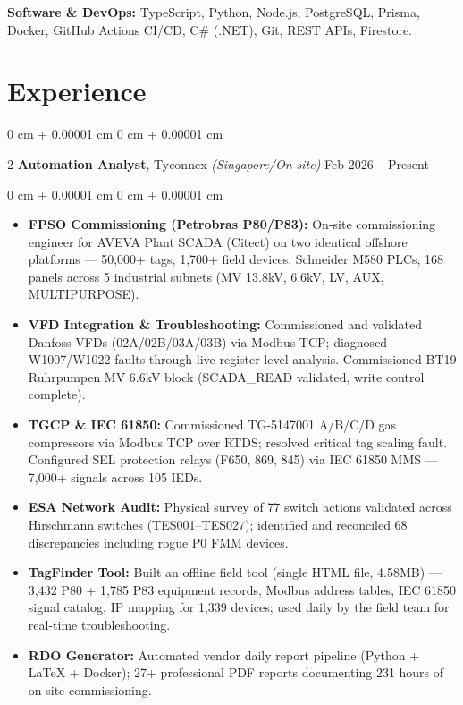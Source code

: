 \documentclass[10pt, letterpaper]{article}
\newenvironment{highlights}{ \begin{itemize}[ topsep=0.10 cm, parsep=0.10 cm, partopsep=0pt,
itemsep=0pt, leftmargin=0 cm + 10pt ] }{ \end{itemize} }
\newenvironment{onecolentry}{ \begin{adjustwidth}{ 0 cm + 0.00001 cm }{ 0 cm + 0.00001 cm }
}{ \end{adjustwidth} }
\newenvironment{twocolentry}[2][]{ \onecolentry \def\secondColumn{#2} \setcolumnwidth{\fill, 4.5 cm}
\begin{paracol}{2} }{ \switchcolumn \raggedleft \secondColumn \end{paracol}
\endonecolentry }
\begin{document}
    \textbf{Software \& DevOps:} TypeScript, Python, Node.js, PostgreSQL, Prisma, Docker, GitHub Actions CI/CD, C\# (.NET), Git, REST APIs, Firestore.

	\section{Experience}

	\begin{twocolentry}
		{ Feb 2026 -- Present } \textbf{Automation Analyst}, Tyconnex \textit{(Singapore/On-site)}
	\end{twocolentry}

	\vspace{0.10 cm}
	\begin{onecolentry}
		\begin{highlights}
			\item \textbf{FPSO Commissioning (Petrobras P80/P83):} On-site commissioning engineer for AVEVA Plant SCADA (Citect) on two identical offshore platforms --- 50,000+ tags, 1,700+ field devices, Schneider M580 PLCs, 168 panels across 5 industrial subnets (MV 13.8kV, 6.6kV, LV, AUX, MULTIPURPOSE).
            \item \textbf{VFD Integration \& Troubleshooting:} Commissioned and validated Danfoss VFDs (02A/02B/03A/03B) via Modbus TCP; diagnosed W1007/W1022 faults through live register-level analysis. Commissioned BT19 Ruhrpumpen MV 6.6kV block (SCADA\_READ validated, write control complete).
            \item \textbf{TGCP \& IEC 61850:} Commissioned TG-5147001 A/B/C/D gas compressors via Modbus TCP over RTDS; resolved critical tag scaling fault. Configured SEL protection relays (F650, 869, 845) via IEC 61850 MMS --- 7,000+ signals across 105 IEDs.
			\item \textbf{ESA Network Audit:} Physical survey of 77 switch actions validated across Hirschmann switches (TES001--TES027); identified and reconciled 68 discrepancies including rogue P0 FMM devices.
            \item \textbf{TagFinder Tool:} Built an offline field tool (single HTML file, 4.58MB) --- 3,432 P80 + 1,785 P83 equipment records, Modbus address tables, IEC 61850 signal catalog, IP mapping for 1,339 devices; used daily by the field team for real-time troubleshooting.
            \item \textbf{RDO Generator:} Automated vendor daily report pipeline (Python + LaTeX + Docker); 27+ professional PDF reports documenting 231 hours of on-site commissioning.
		\end{highlights}
	\end{onecolentry}
\end{document}
